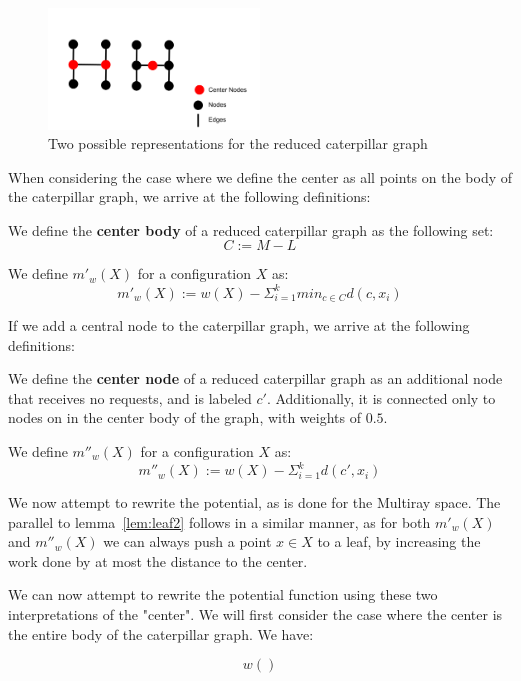 \begin{figure}[H]
    \centering
    \includegraphics[width=0.5\textwidth]{images/center.png}
    \caption{Two possible representations for the reduced caterpillar graph}
    \label{fig:smallcat}
\end{figure}

When considering the case where we define the center as all points on the body of the caterpillar graph, we arrive at the following definitions:

\begin{definition}
     We define the \textbf{center body} of a reduced caterpillar graph as the following set:
        \begin{equation*}
            C := M - L
        \end{equation*}
\end{definition}

\begin{definition}
    We define $m'_w(X)$ for a configuration $X$ as:
    \begin{equation*}
        m'_w(X) := w(X) - \Sigma_{i=1} ^ k min_{c \in C} d(c, x_i)
    \end{equation*}
\end{definition}

If we add a central node to the caterpillar graph, we arrive at the following definitions:

\begin{definition}
    We define the \textbf{center node} of a reduced caterpillar graph as an additional node that receives no requests, and is labeled $c'$. Additionally, it is connected only to nodes on in the center body of the graph, with weights of $0.5$.
\end{definition}

\begin{definition}
    We define $m''_w(X)$ for a configuration $X$ as:
    \begin{equation*}
        m''_w(X) := w(X) - \Sigma_{i=1} ^ k d(c', x_i)
    \end{equation*}
\end{definition}

We now attempt to rewrite the potential, as is done for the Multiray space. The parallel to lemma~\ref{lem:leaf2} follows in a similar manner, as for both $m'_w(X)$ and $m''_w(X)$ we can always push a point $x \in X$ to a leaf, by increasing the work done by at most the distance to the center.

We can now attempt to rewrite the potential function using these two interpretations of the "center". We will first consider the case where the center is the entire body of the caterpillar graph. We have:

\begin{equation*}
    w()
\end{equation*}

